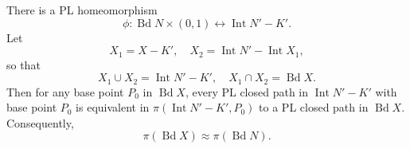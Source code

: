 There is a PL homeomorphism
$$\phi: \operatorname{Bd} N \times (0, 1) \leftrightarrow \operatorname{Int} N' - K'.$$
Let
$$X_1 = X - K', \quad X_2 = \operatorname{Int} N' - \operatorname{Int} X_1,$$
so that
$$X_1 \cup X_2 = \operatorname{Int} N' - K', \quad X_1 \cap X_2 = \operatorname{Bd} X.$$
Then for any base point $P_0$ in $\operatorname{Bd} X$, every PL closed path in $\operatorname{Int} N' - K'$ with base point $P_0$ is equivalent in $\pi(\operatorname{Int} N' - K', P_0)$ to a PL closed path in $\operatorname{Bd} X$. Consequently,
$$\pi(\operatorname{Bd} X) \approx \pi(\operatorname{Bd} N).$$
